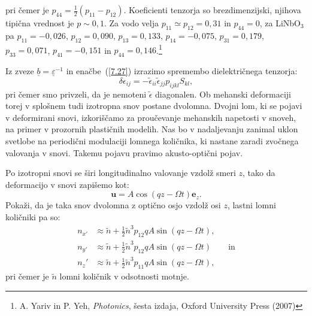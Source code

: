 pri čemer je $p_{44}= \frac{1}{2}(p_{11}-p_{12})$. Koeficienti tenzorja so 
brezdimenzijski, njihova tipična vrednost je $p\sim0,1$. Za vodo 
velja $p_{11} \simeq p_{12} = 0,31$ in $p_{44} = 0$, za LiNbO$_3$ pa 
$p_{11} = -0,026$, 
$p_{12} = 0,090$, 
$p_{13} = 0,133$, 
$p_{14} = -0,075$, 
$p_{31} = 0,179$, 
$p_{33} = 0,071$,
$p_{41} = -0,151$ in 
$p_{44} = 0,146$.\footnote{A. Yariv in 
P. Yeh, {\it Photonics}, šesta izdaja, Oxford University Press (2007)}

Iz zveze $\underline{b} = \underline{\varepsilon}^{-1}$ in enačbe~(\ref{7.27}) izrazimo
spremembo dielektričnega tenzorja:
\begin{equation}
\delta\epsilon_{ij}=-\tilde{\epsilon}_{ii}\tilde{\epsilon}_{jj}p_{ijkl}S_{kl},
\label{7.29}
\end{equation}
pri čemer smo privzeli, da je nemoteni $\tilde{\epsilon}$ diagonalen. Ob mehanski deformaciji
torej v splošnem tudi izotropna snov postane dvolomna.
Dvojni lom, ki se pojavi v deformirani snovi, izkoriščamo za proučevanje
mehanskih napetosti v snoveh, na primer v prozornih plastičnih modelih. 
Nas bo v nadaljevanju zanimal uklon  svetlobe na periodični
modulaciji lomnega količnika, ki nastane zaradi zvočnega valovanja v snovi. Takemu pojavu
pravimo akusto-optični pojav.

\begin{naloga}
\label{nalogaAO}
Po izotropni snovi se širi longitudinalno valovanje vzdolž smeri $z$, tako da 
deformacijo v snovi zapišemo kot:
\begin{equation}
\mathbf{u} = A \cos(q z - \Omega t)\mathbf{e}_z.
\end{equation}
Pokaži, da je taka snov dvolomna z optično osjo vzdolž osi $z$, lastni 
lomni količniki pa so:
\begin{align}
n_{x'} &\approx \tilde{n}+\frac{1}{2}\tilde{n}^3p_{12}q A \sin (q z - \Omega t),\\
n_{y'} &\approx \tilde{n}+\frac{1}{2}\tilde{n}^3p_{12}q A \sin (q z - \Omega t) \qquad \mathrm{in}\\
n_z' &\approx \tilde{n}+\frac{1}{2}\tilde{n}^3p_{11}q A \sin (q z - \Omega t),
\end{align}
pri čemer je $\tilde{n}$ lomni količnik v odsotnosti motnje.
\end{naloga}

